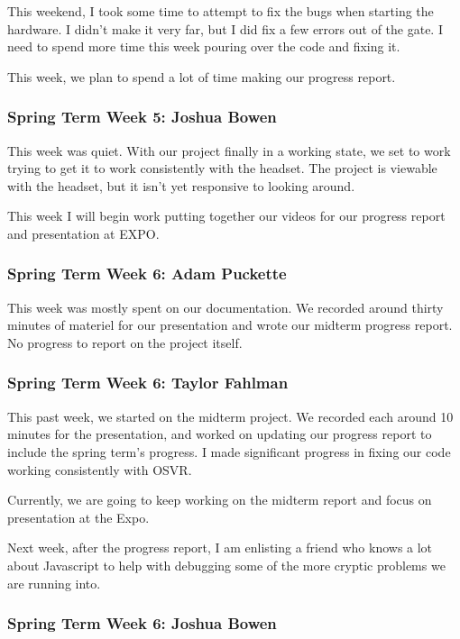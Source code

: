 \documentclass[draftclsnofoot,onecolumn]{IEEEtran}
\begin{document}
This weekend, I took some time to attempt to fix the bugs when starting the hardware. I didn't make it very far, but I did fix a few errors out of the gate. I need to spend more time this week pouring over the code and fixing it.

This week, we plan to spend a lot of time making our progress report.

\subsubsection{Spring Term Week 5: Joshua Bowen}

This week was quiet. With our project finally in a working state, we set to work trying to get it to work consistently with the headset. The project is viewable with the headset, but it isn't yet responsive to looking around.

This week I will begin work putting together our videos for our progress report and presentation at EXPO.

\subsubsection{Spring Term Week 6: Adam Puckette}

This week was mostly spent on our documentation. We recorded around thirty minutes of materiel for our presentation and wrote our midterm progress report. No progress to report on the project itself.

\subsubsection{Spring Term Week 6: Taylor Fahlman}

This past week, we started on the midterm project. We recorded each around 10 minutes for the presentation, and worked on updating our progress report to include the spring term's progress. I made significant progress in fixing our code working consistently with OSVR.

Currently, we are going to keep working on the midterm report and focus on presentation at the Expo.

Next week, after the progress report, I am enlisting a friend who knows a lot about Javascript to help with debugging some of the more cryptic problems we are running into.

\subsubsection{Spring Term Week 6: Joshua Bowen}
\end{document}
